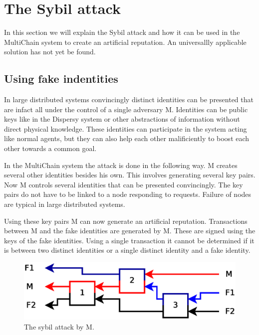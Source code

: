 \section{The Sybil attack}

In this section we will explain the Sybil attack\cite{douceur-sybil}
and how it can be used in the MultiChain system to create an artificial reputation.
An universallly applicable solution has not yet be found\cite{levine-sybilsurvey}.

\subsection{Using fake indentities}
In large distributed systems convincingly distinct identities can be presented
that are infact all under the control of a single adversary M.
Identities can be public keys like in the Dispersy system
or other abstractions of information without direct physical knowledge.
These identities can participate in the system acting like normal agents,
but they can also help each other malificiently to boost each other towards a common goal.

In the MultiChain system the attack is done in the following way.
M creates several other identities besides his own.
This involves generating several key pairs.
Now M controls several identities that can be presented convincingly.
The key pairs do not have to be linked to a node responding to requests.
Failure of nodes are typical in large distributed systems.

Using these key pairs M can now generate an artificial reputation.
Transactions between M and the fake identities are generated by M.
These are signed using the keys of the fake identities.
Using a single transaction it cannot be determined if it is between two distinct identities or a single distinct identity and a fake identity.

\begin{figure}
	\centerline{\includegraphics[scale=0.3]{problems/figs/sybil.eps}}
	\caption{The sybil attack by M.}
	\label{fig:sybil-example}
\end{figure}

